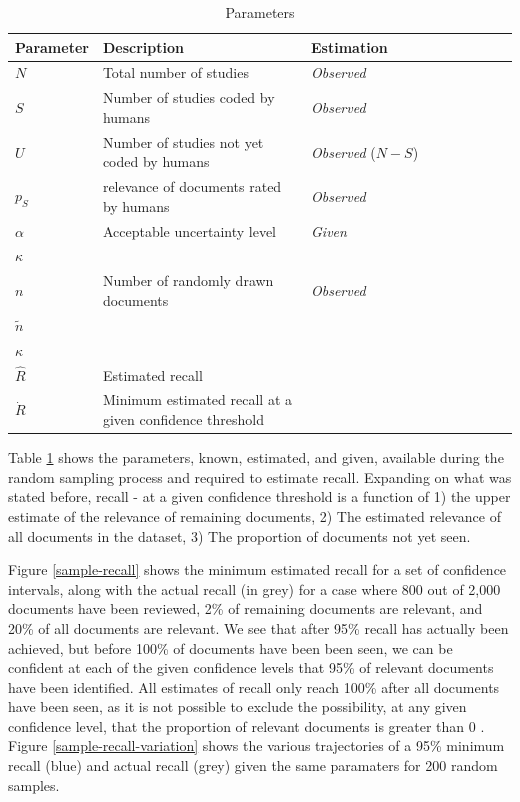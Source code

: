 \documentclass{bmcart}
\begin{document}
	\begin{table}
		\begin{tabular}{p{0.15\linewidth} p{0.425\linewidth} p{0.425\linewidth}}
			Parameter & Description & Estimation \\
			\hline
			$ N  $ &  Total number of studies & \textit{Observed} \\
			$ S $ & Number of studies coded by humans & \textit{Observed} \\
			$ U $ & Number of studies not yet coded by humans & \textit{Observed} ($N - S$) \\
			$ p_S $ & relevance of documents rated by humans & \textit{Observed} \\
			$ \alpha $ & Acceptable uncertainty level & \textit{Given} \\
			$ \kappa $ & & \\
			$ n $ & Number of randomly drawn documents & \textit{Observed} \\
			$ \tilde{n} $ & & \\
			$ \kappa $ & & \\
			$ \hat{R} $ & Estimated recall & \\
			$ \dot{R} $ & Minimum estimated recall at a given confidence threshold & \\
		\end{tabular}
		\caption{Parameters}
		\label{parameters}
	\end{table}
	
	Table \ref{parameters} shows the parameters, known, estimated, and given, available during the random sampling process and required to estimate recall. 
	Expanding on what was stated before, recall - at a given confidence threshold is a function of 1) the upper estimate of the relevance of remaining documents, 2) The estimated relevance of all documents in the dataset, 3) The proportion of documents not yet seen. 
	
	Figure \ref{sample-recall} shows the minimum estimated recall for a set of confidence intervals, along with the actual recall (in grey) for a case where 800 out of 2,000 documents have been reviewed, 2\% of remaining documents are relevant, and 20\% of all documents are relevant. 
	We see that after 95\% recall has actually been achieved, but before 100\% of documents have been been seen, we can be confident at each of the given confidence levels that 95\% of relevant documents have been identified. 
	All estimates of recall only reach 100\% after all documents have been seen, as it is not possible to exclude the possibility, at any given confidence level, that the proportion of relevant documents is greater than 0 . 
	Figure \ref{sample-recall-variation} shows the various trajectories of a 95\% minimum recall (blue) and actual recall (grey) given the same paramaters for 200 random samples.
\end{document}
